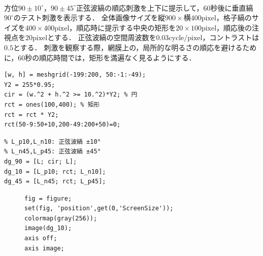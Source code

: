 \paragraph{\kadaicb}
方位\(90\pm 10^\circ\)，\(90\pm 45^\circ\)正弦波縞の順応刺激を上下に提示して，\(60\)秒後に垂直縞\(90^\circ\)のテスト刺激を表示する．
全体画像サイズを\(\textrm{縦}900\times\textrm{横}400\textrm{pixel}\)，格子縞のサイズを\(400\times 400\textrm{pixel}\)，順応時に提示する中央の矩形を\(20\times 100\textrm{pixel}\)，順応後の注視点を\(20\textrm{pixel}\)とする．
正弦波縞の空間周波数を\(0.03\textrm{cycle}/\textrm{pixel}\)，コントラストは\(0.5\)とする．
刺激を観察する際，網膜上の，局所的な明るさの順応を避けるために，\(60\)秒の順応時間では，矩形を満遍なく見るようにする．
\begin{flushright}
    \vspace{-1em}
    \begin{minipage}[t]{.48\textwidth}
        \begin{lstlisting}[caption={矩形と円の作成},label={src:矩形と円の作成}]
[w, h] = meshgrid(-199:200, 50:-1:-49);
Y2 = 255*0.95;
cir = (w.^2 + h.^2 >= 10.^2)*Y2; % 円
rct = ones(100,400); % 矩形
rct = rct * Y2;
rct(50-9:50+10,200-49:200+50)=0;
        \end{lstlisting}
    \end{minipage}
    \hspace{.5em}
    \begin{minipage}[t]{.48\textwidth}
        \begin{lstlisting}[caption={順応刺激画像の作成},label={src:順応刺激画像の作成}]
% L: 正弦波縞 90°
% L_p10,L_n10: 正弦波縞 ±10° 
% L_n45,L_p45: 正弦波縞 ±45°
dg_90 = [L; cir; L];
dg_10 = [L_p10; rct; L_n10];
dg_45 = [L_n45; rct; L_p45];
        \end{lstlisting}
    \end{minipage}
    \vspace{-.5em}
\end{flushright}

\begin{figure}
    \vspace{-1cm}
    \begin{lstlisting}[caption={刺激画像の表示方法},label={src:刺激画像の表示方法}]
fig = figure;
set(fig, 'position',get(0,'ScreenSize'));
colormap(gray(256));
image(dg_10);
axis off;
axis image;    
    \end{lstlisting}
    \vspace{-1cm}
\end{figure}
